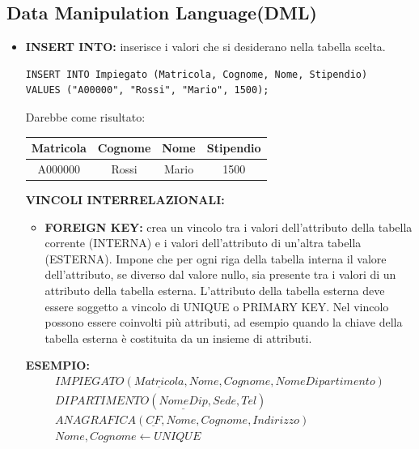 \documentclass{article}
\newcounter{esempio}
\begin{document}
\subsection{Data Manipulation Language(DML)}
\begin{itemize}
\item \textbf{INSERT INTO:} inserisce i valori che si desiderano nella tabella scelta.

\begin{lstlisting}[style=sqlstyle]
INSERT INTO Impiegato (Matricola, Cognome, Nome, Stipendio) 
VALUES ("A00000", "Rossi", "Mario", 1500);
\end{lstlisting}

Darebbe come risultato:
\begin{table}[h!]
	\centering
	\begin{tabular}{|c|c|c|c|}
		\hline
		\textbf{Matricola} & \textbf{Cognome} & \textbf{Nome} & \textbf{Stipendio} \\
		\hline
		A000000 & Rossi & Mario & 1500 \\
		\hline
	\end{tabular}
\end{table}

\textbf{VINCOLI INTERRELAZIONALI:}
\begin{itemize}
    \item \textbf{FOREIGN KEY:} crea un vincolo tra i valori dell'attributo della tabella corrente (INTERNA) 
    e i valori dell'attributo di un'altra tabella (ESTERNA). Impone che per ogni riga della tabella interna il valore
    dell'attributo, se diverso dal valore nullo, sia presente tra i valori di un attributo della tabella esterna.
    L'attributo della tabella esterna deve essere soggetto a vincolo di UNIQUE o PRIMARY KEY.
    Nel vincolo possono essere coinvolti più attributi, ad esempio
    quando la chiave della tabella esterna è costituita da un insieme di
    attributi.
\end{itemize}


\textbf{ESEMPIO:}
\begin{align*}
    IMPIEGATO(\underline{Matricola}, Nome, Cognome, NomeDipartimento)\\
    DIPARTIMENTO(\underline{NomeDip}, Sede, Tel)\\
    ANAGRAFICA(\underline{CF}, Nome, Cognome, Indirizzo)
    \\ Nome, Cognome \leftarrow UNIQUE
\end{align*}


\end{itemize}
\end{document}
